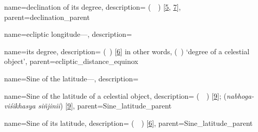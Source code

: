 {
        name={declination of its degree},
        description={ (\mayl\idafaconsonant\ \daraji\idafavowel\ \uy) [\hyperlink{PEpass5}{5}, \hyperlink{PEpass7}{7}]},
        parent={declination_parent}
}        

{
        name={ecliptic longitude---},
        description={\phantom{x}\nopagebreak}
}




{
        name={its degree},
        description={ (\daraji\idafavowel\ \uy) [\hyperlink{PEpass6}{6}]\newline
        in other words,  (\daraji\idafavowel\ \kawkab) `degree of a celestial object'},
        parent={ecliptic_distance_equinox}
} 

{
        name={Sine of the latitude---},
        description={\phantom{x}\nopagebreak}
}
    
{
        name={Sine of the latitude of a celestial object},
        description={ (\jayb\idafaconsonant\ \ard\idafaconsonant\ \kawkab) [\hyperlink{PEpass9}{9}];  (\textit{nabhoga-viśikhasya siñjinii}) [\hyperlink{SEpass9}{9}]},
        parent={Sine_latitude_parent}
}

{
        name={Sine of its latitude},
        description={ (\jayb\idafaconsonant\ \ard\idafaconsonant\ \uy) [\hyperlink{PEpass6}{6}]},    
        parent={Sine_latitude_parent}
}

